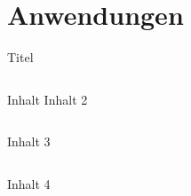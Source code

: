 \section{Anwendungen}
	
	{
	\begin{frame}{Titel}
		\begin{columns}[T,onlytextwidth]
			Inhalt
			Inhalt 2
		\end{columns}
		Inhalt 3 \pause
		\begin{columns}[c,onlytextwidth]
			\centering
			Inhalt 4
			
			\vspace{15pt}\ \\
		\end{columns}
	\end{frame}}